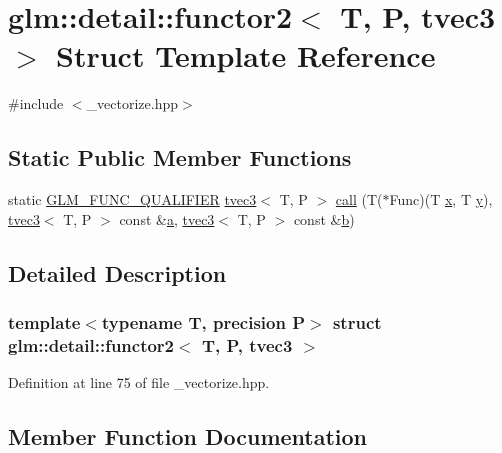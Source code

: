\hypertarget{structglm_1_1detail_1_1functor2_3_01_t_00_01_p_00_01tvec3_01_4}{}\section{glm\+::detail\+::functor2$<$ T, P, tvec3 $>$ Struct Template Reference}
\label{structglm_1_1detail_1_1functor2_3_01_t_00_01_p_00_01tvec3_01_4}


{\ttfamily \#include $<$\+\_\+vectorize.\+hpp$>$}

\subsection*{Static Public Member Functions}
\begin{DoxyCompactItemize}
\item 
static \mbox{\hyperlink{setup_8hpp_a33fdea6f91c5f834105f7415e2a64407}{G\+L\+M\+\_\+\+F\+U\+N\+C\+\_\+\+Q\+U\+A\+L\+I\+F\+I\+ER}} \mbox{\hyperlink{structglm_1_1tvec3}{tvec3}}$<$ T, P $>$ \mbox{\hyperlink{structglm_1_1detail_1_1functor2_3_01_t_00_01_p_00_01tvec3_01_4_a2dc546f8027af1bbceab38b5a2b5a146}{call}} (T($\ast$Func)(T \mbox{\hyperlink{glad_8h_a92d0386e5c19fb81ea88c9f99644ab1d}{x}}, T \mbox{\hyperlink{glad_8h_a66ddd433d2cacfe27f5906b7e86faeed}{y}}), \mbox{\hyperlink{structglm_1_1tvec3}{tvec3}}$<$ T, P $>$ const \&\mbox{\hyperlink{glad_8h_ac8729153468b5dcf13f971b21d84d4e5}{a}}, \mbox{\hyperlink{structglm_1_1tvec3}{tvec3}}$<$ T, P $>$ const \&\mbox{\hyperlink{glad_8h_a6eba317e3cf44d6d26c04a5a8f197dcb}{b}})
\end{DoxyCompactItemize}


\subsection{Detailed Description}
\subsubsection*{template$<$typename T, precision P$>$\newline
struct glm\+::detail\+::functor2$<$ T, P, tvec3 $>$}



Definition at line 75 of file \+\_\+vectorize.\+hpp.



\subsection{Member Function Documentation}
\mbox{\label{structglm_1_1detail_1_1functor2_3_01_t_00_01_p_00_01tvec3_01_4_a2dc546f8027af1bbceab38b5a2b5a146}} 
